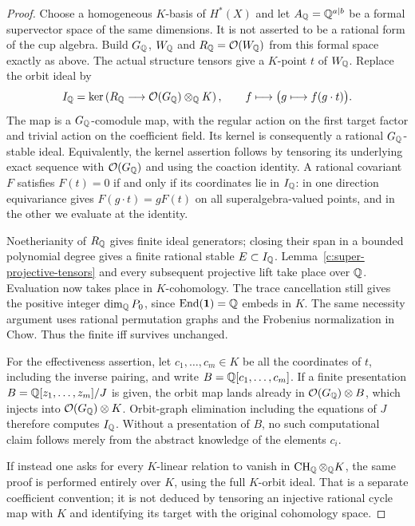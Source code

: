 \begin{proof}
Choose a homogeneous $K$-basis of $H^*(X)$ and let
$A_\mathbb Q=\mathbb Q^{a|b}$ be a formal supervector space of the same
dimensions.  It is not asserted to be a rational form of the cup
algebra.  Build $G_\mathbb Q$, $W_\mathbb Q$ and $R_\mathbb Q=\mathcal O(W_\mathbb Q)$
from this formal space exactly as above.  The actual structure
tensors give a $K$-point $t$ of $W_\mathbb Q$.  Replace the orbit ideal by
\[
 I_\mathbb Q=\ker\left(R_\mathbb Q\longrightarrow
        \mathcal O(G_\mathbb Q)\otimes_\mathbb Q K\right),
 \qquad f\longmapsto\bigl(g\longmapsto f(g\cdot t)\bigr).
\]
The map is a $G_\mathbb Q$-comodule map, with the regular action on the
first target factor and trivial action on the coefficient field.
Its kernel is consequently a rational $G_\mathbb Q$-stable ideal.
Equivalently, the kernel assertion follows by tensoring its
underlying exact sequence with $\mathcal O(G_\mathbb Q)$ and using the
coaction identity.  A rational covariant $F$ satisfies $F(t)=0$
if and only if its coordinates lie in $I_\mathbb Q$: in one direction
equivariance gives $F(g\cdot t)=gF(t)$ on all superalgebra-valued
points, and in the other we evaluate at the identity.

Noetherianity of $R_\mathbb Q$ gives finite ideal generators; closing
their span in a bounded polynomial degree gives a finite rational
stable $E\subset I_\mathbb Q$.  Lemma~\ref{c:super-projective-tensors}
and every subsequent projective lift take place over $\mathbb Q$.
Evaluation now takes place in $K$-cohomology.  The trace cancellation
still gives the positive integer $\dim_\mathbb Q P_0$, since
$\operatorname{End}(\mathbf1)=\mathbb Q$ embeds in $K$.
The same necessity argument uses rational permutation graphs and
the Frobenius normalization in Chow.  Thus the finite iff survives
unchanged.

For the effectiveness assertion, let $c_1,\ldots,c_m\in K$ be
all the coordinates of $t$, including the inverse pairing, and
write $B=\mathbb Q[c_1,\ldots,c_m]$.  If a finite presentation
$B=\mathbb Q[z_1,\ldots,z_m]/J$ is given, the orbit map lands already
in $\mathcal O(G_\mathbb Q)\otimes B$, which injects into
$\mathcal O(G_\mathbb Q)\otimes K$.  Orbit-graph elimination including
the equations of $J$ therefore computes $I_\mathbb Q$.  Without a
presentation of $B$, no such computational claim follows merely
from the abstract knowledge of the elements $c_i$.

If instead one asks for every $K$-linear relation to vanish in
$\operatorname{CH}_\mathbb Q\otimes_\mathbb Q K$, the same proof is performed entirely over
$K$, using the full $K$-orbit ideal.  That is a separate
coefficient convention; it is not deduced by tensoring an
injective rational cycle map with $K$ and identifying its target
with the original cohomology space.
\end{proof}

